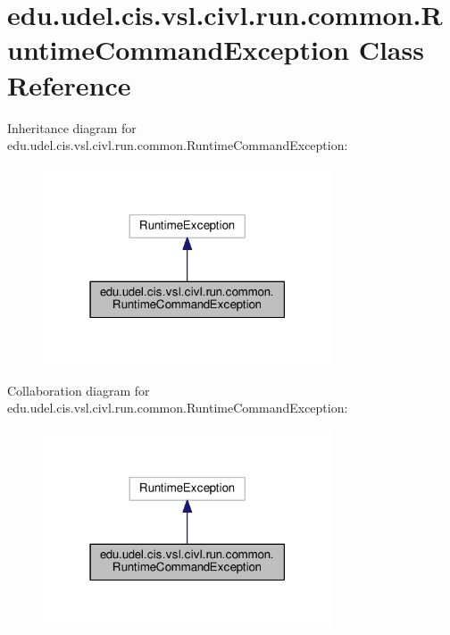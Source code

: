 \hypertarget{classedu_1_1udel_1_1cis_1_1vsl_1_1civl_1_1run_1_1common_1_1RuntimeCommandException}{}\section{edu.\+udel.\+cis.\+vsl.\+civl.\+run.\+common.\+Runtime\+Command\+Exception Class Reference}
\label{classedu_1_1udel_1_1cis_1_1vsl_1_1civl_1_1run_1_1common_1_1RuntimeCommandException}


Inheritance diagram for edu.\+udel.\+cis.\+vsl.\+civl.\+run.\+common.\+Runtime\+Command\+Exception\+:
\nopagebreak
\begin{figure}[H]
\begin{center}
\leavevmode
\includegraphics[width=243pt]{classedu_1_1udel_1_1cis_1_1vsl_1_1civl_1_1run_1_1common_1_1RuntimeCommandException__inherit__graph}
\end{center}
\end{figure}


Collaboration diagram for edu.\+udel.\+cis.\+vsl.\+civl.\+run.\+common.\+Runtime\+Command\+Exception\+:
\nopagebreak
\begin{figure}[H]
\begin{center}
\leavevmode
\includegraphics[width=243pt]{classedu_1_1udel_1_1cis_1_1vsl_1_1civl_1_1run_1_1common_1_1RuntimeCommandException__coll__graph}
\end{center}
\end{figure}
